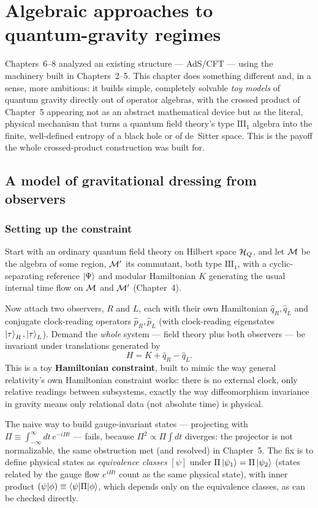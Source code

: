 \chapter[Algebraic approaches to quantum-gravity regimes]{Algebraic approaches to\\ quantum-gravity regimes}

Chapters~6--8 analyzed an existing structure — AdS/CFT — using the machinery built in Chapters~2--5. This
chapter does something different and, in a sense, more ambitious: it builds simple, completely solvable
\emph{toy models} of quantum gravity directly out of operator algebras, with the crossed product of Chapter~5
appearing not as an abstract mathematical device but as the literal, physical mechanism that turns a quantum
field theory's type $\mathrm{III}_1$ algebra into the finite, well-defined entropy of a black hole or of
de~Sitter space. This is the payoff the whole crossed-product construction was built for.

\section{A model of gravitational dressing from observers}

\subsection*{Setting up the constraint}

Start with an ordinary quantum field theory on Hilbert space $\mathcal{H}_Q$, and let $\mathcal{M}$ be the algebra of some
region, $\mathcal{M}'$ its commutant, both type $\mathrm{III}_1$, with a cyclic-separating reference $\ket\Psi$ and
modular Hamiltonian $K$ generating the usual internal time flow on $\mathcal{M}$ and $\mathcal{M}'$ (Chapter~4).

Now attach two observers, $R$ and $L$, each with their own Hamiltonian $\hat q_R,\hat q_L$ and conjugate
clock-reading operators $\hat p_R,\hat p_L$ (with clock-reading eigenstates $\ket\tau_R,\ket\tau_L$). Demand
the \emph{whole} system — field theory plus both observers — be invariant under translations generated by
\[
H = K + \hat q_R - \hat q_L .
\]
This is a toy \textbf{Hamiltonian constraint}, built to mimic the way general relativity's own Hamiltonian
constraint works: there is no external clock, only relative readings between subsystems, exactly the way
diffeomorphism invariance in gravity means only relational data (not absolute time) is physical.

The naive way to build gauge-invariant states — projecting with $\Pi\equiv\int_{-\infty}^\infty dt\,e^{-iHt}$
— fails, because $\Pi^2\propto\Pi\int dt$ diverges: the projector is not normalizable, the same obstruction met
(and resolved) in Chapter~5. The fix is to define physical states as \emph{equivalence classes} $[\psi]$ under
$\Pi\ket{\psi_1}=\Pi\ket{\psi_2}$ (states related by the gauge flow $e^{iHt}$ count as the same physical
state), with inner product $(\psi|\phi)\equiv\braket{\psi|\Pi|\phi}$, which depends only on the equivalence
classes, as can be checked directly.

